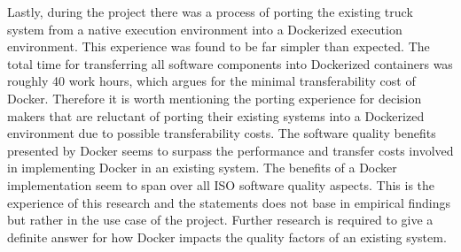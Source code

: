 Lastly, during the project there was a process of porting the existing truck system from a native execution environment into a Dockerized execution environment. This experience was found to be far simpler than expected. The total time for transferring all software components into Dockerized containers was roughly 40 work hours, which argues for the minimal transferability cost of Docker. Therefore it is worth mentioning the porting experience for decision makers that are reluctant of porting their existing systems into a Dockerized environment due to possible transferability costs. The software quality benefits presented by Docker seems to surpass the performance and transfer costs involved in implementing Docker in an existing system. The benefits of a Docker implementation seem to span over all ISO software quality aspects. This is the experience of this research and the statements does not base in empirical findings but rather in the use case of the project. Further research is required to give a definite answer for how Docker impacts the quality factors of an existing system.\\